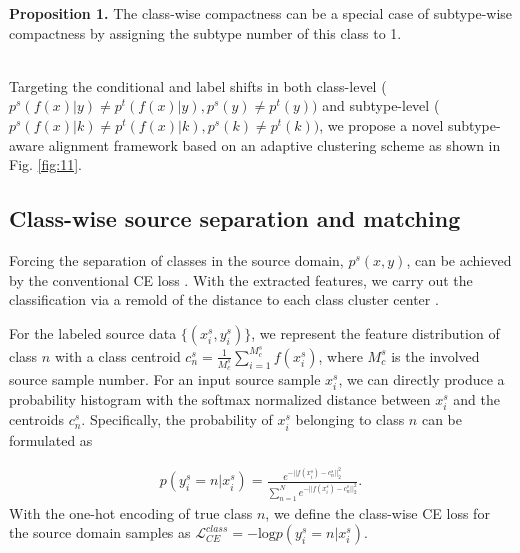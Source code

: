 \noindent\textbf{Proposition 1.} The class-wise compactness can be a special case of subtype-wise compactness by assigning the subtype number of this class to 1. \\~

Targeting the conditional and label shifts in both class-level ($p^s(f(x)|y)\neq p^t(f(x)|y), p^s(y)\neq p^t(y))$ and subtype-level ($p^s(f(x)|k)\neq p^t(f(x)|k), p^s(k)\neq p^t(k))$, we propose a novel subtype-aware alignment framework based on an adaptive clustering scheme as shown in Fig. \ref{fig:11}. 
 
\subsection{Class-wise source separation and matching} 

Forcing the separation of classes in the source domain, $p^s(x,y)$, can be achieved by the conventional CE loss \cite{liu2016large}. With the extracted features, we carry out the classification via a remold of the distance to each class cluster center \cite{chen2019progressive,pan2019transferrable}.



For the labeled source data $\{(x_i^s,y_i^s)\}$, we represent the feature distribution of class $n$ with a class centroid $c_n^s=\frac{1}{M_c^s}\sum_{i=1}^{M_c^s}f(x_i^s)$, where ${M_c^s}$ is the involved source sample number. For an input source sample $x_i^s$, we can directly produce a probability histogram with the softmax normalized distance between $x_i^s$ and the centroids $c_n^s$. Specifically, the probability of $x_i^s$ belonging to class $n$ can be formulated as 

 
\begin{equation}
\begin{aligned}
p(y_i^s=n|x_i^s)=\frac{e^{-||f(x_i^s)-c_n^s||_2^2}}{\sum_{n=1}^N e^{-||f(x_i^s)-c_n^s||_2^2}}.\label{eq:1}
\end{aligned}\end{equation} With the one-hot encoding of true class $n$, we define the class-wise CE loss for the source domain samples as $\mathcal{L}_{CE}^{class}=-\text{log} p(y_i^s=n|x_i^s)$.  

 

